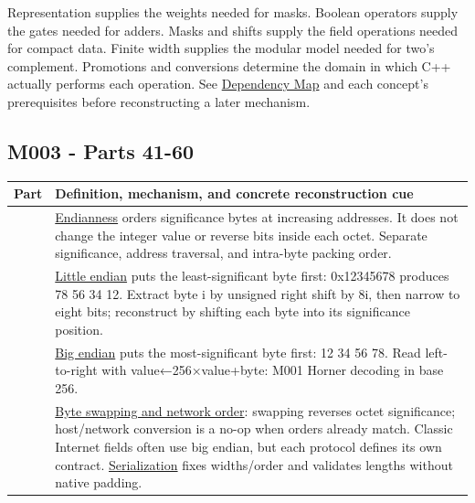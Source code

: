 Representation supplies the weights needed for masks. Boolean operators supply the gates needed for adders. Masks and shifts supply the field operations needed for compact data. Finite width supplies the modular model needed for two's complement. Promotions and conversions determine the domain in which C++ actually performs each operation. See \hyperref[appendix-4ad47bdd269a]{Dependency Map} and each concept's prerequisites before reconstructing a later mechanism.

\subsection{M003 - Parts 41-60}\label{appendix-fd090d982a15-m003---parts-41-60}

{\def\LTcaptype{none} %
\begin{longtable}[]{@{}
  >{\raggedright\arraybackslash}p{}
  >{\raggedright\arraybackslash}p{}@{}}
\toprule\noalign{}
\begin{minipage}[b]{\linewidth}\raggedright
Part
\end{minipage} & \begin{minipage}[b]{\linewidth}\raggedright
Definition, mechanism, and concrete reconstruction cue
\end{minipage} \\
\midrule\noalign{}
\endhead
\bottomrule\noalign{}
\endlastfoot
41 & \hyperref[appendix-bc07c3d25b18]{Endianness} orders significance bytes at increasing addresses. It does not change the integer value or reverse bits inside each octet. Separate significance, address traversal, and intra-byte packing order. \\
42 & \hyperref[appendix-367b6abf460e]{Little endian} puts the least-significant byte first: 0x12345678 produces 78 56 34 12. Extract byte i by unsigned right shift by 8i, then narrow to eight bits; reconstruct by shifting each byte into its significance position. \\
43 & \hyperref[appendix-92e040df969a]{Big endian} puts the most-significant byte first: 12 34 56 78. Read left-to-right with value←256×value+byte: M001 Horner decoding in base 256. \\
44 & \hyperref[appendix-11ba36693aa2]{Byte swapping and network order}: swapping reverses octet significance; host/network conversion is a no-op when orders already match. Classic Internet fields often use big endian, but each protocol defines its own contract. \hyperref[appendix-91d09ebed979]{Serialization} fixes widths/order and validates lengths without native padding. \\

\end{longtable}}
